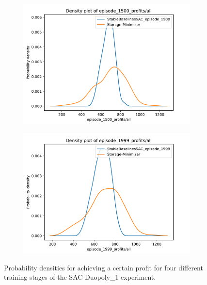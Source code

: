 \begin{figure}
\begin{subfigure}{0.49\textwidth}
		\label{fig:SACDuopolyProfitsDensity2}
	\end{subfigure}
	\begin{subfigure}{0.49\textwidth}
		\centering
		\includegraphics[width = \textwidth]{images/experiments/SACDuopoly/SACDuopolyProfitsDensity3.pdf}\\
		\label{fig:SACDuopolyProfitsDensity3}
	\end{subfigure}
	\begin{subfigure}{0.49\textwidth}
		\centering
		\includegraphics[width = \textwidth]{images/experiments/SACDuopoly/SACDuopolyProfitsDensity4.pdf}\\
		\label{fig:SACDuopolyProfitsDensity4}
	\end{subfigure}
	\caption{Probability densities for achieving a certain profit for four different training stages of the SAC-Duopoly\_1 experiment.}\label{fig:SACDuopolyProfitsDensity}
\end{figure}

